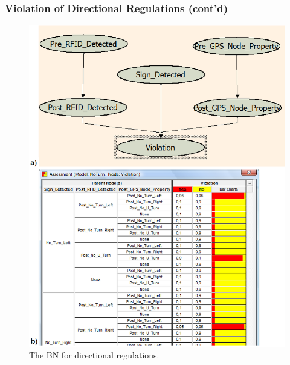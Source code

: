 \documentclass{beamer}
\begin{document}
\begin{frame}[fragile]
	\frametitle{Violation of Directional Regulations (cont'd)}
	\begin{figure}
	\begin{center}
	\includegraphics[width=.5\paperwidth]{../img/no_turn_bn.eps}
	\caption{The BN for directional regulations.}
	\label{fig:bnsign}
	\end{center}
	\end{figure}
\end{frame}
\end{document}
